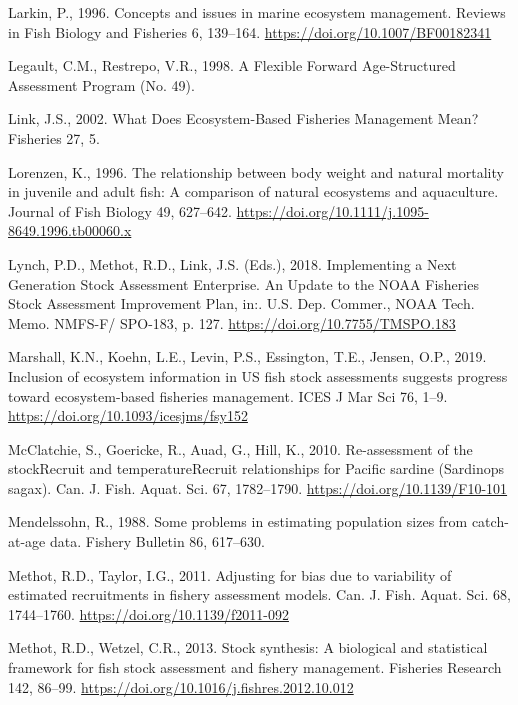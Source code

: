 \documentclass[]{article}
\begin{document}
\leavevmode\hypertarget{ref-larkin1996Concepts}{}%
Larkin, P., 1996. Concepts and issues in marine ecosystem management.
Reviews in Fish Biology and Fisheries 6, 139--164.
\url{https://doi.org/10.1007/BF00182341}

\leavevmode\hypertarget{ref-legault1998Flexible}{}%
Legault, C.M., Restrepo, V.R., 1998. A Flexible Forward Age-Structured
Assessment Program (No. 49).

\leavevmode\hypertarget{ref-link2002What}{}%
Link, J.S., 2002. What Does Ecosystem-Based Fisheries Management Mean?
Fisheries 27, 5.

\leavevmode\hypertarget{ref-lorenzen1996Relationship}{}%
Lorenzen, K., 1996. The relationship between body weight and natural
mortality in juvenile and adult fish: A comparison of natural ecosystems
and aquaculture. Journal of Fish Biology 49, 627--642.
\url{https://doi.org/10.1111/j.1095-8649.1996.tb00060.x}

\leavevmode\hypertarget{ref-lynch2018Implementing}{}%
Lynch, P.D., Methot, R.D., Link, J.S. (Eds.), 2018. Implementing a Next
Generation Stock Assessment Enterprise. An Update to the NOAA Fisheries
Stock Assessment Improvement Plan, in:. U.S. Dep. Commer., NOAA Tech.
Memo. NMFS-F/ SPO-183, p. 127. \url{https://doi.org/10.7755/TMSPO.183}

\leavevmode\hypertarget{ref-marshall2019Inclusion}{}%
Marshall, K.N., Koehn, L.E., Levin, P.S., Essington, T.E., Jensen, O.P.,
2019. Inclusion of ecosystem information in US fish stock assessments
suggests progress toward ecosystem-based fisheries management. ICES J
Mar Sci 76, 1--9. \url{https://doi.org/10.1093/icesjms/fsy152}

\leavevmode\hypertarget{ref-mcclatchie2010Reassessment}{}%
McClatchie, S., Goericke, R., Auad, G., Hill, K., 2010. Re-assessment of
the stockRecruit and temperatureRecruit relationships for Pacific
sardine (Sardinops sagax). Can. J. Fish. Aquat. Sci. 67, 1782--1790.
\url{https://doi.org/10.1139/F10-101}

\leavevmode\hypertarget{ref-mendelssohn1988Problems}{}%
Mendelssohn, R., 1988. Some problems in estimating population sizes from
catch-at-age data. Fishery Bulletin 86, 617--630.

\leavevmode\hypertarget{ref-methot2011Adjusting}{}%
Methot, R.D., Taylor, I.G., 2011. Adjusting for bias due to variability
of estimated recruitments in fishery assessment models. Can. J. Fish.
Aquat. Sci. 68, 1744--1760. \url{https://doi.org/10.1139/f2011-092}

\leavevmode\hypertarget{ref-methot2013Stock}{}%
Methot, R.D., Wetzel, C.R., 2013. Stock synthesis: A biological and
statistical framework for fish stock assessment and fishery management.
Fisheries Research 142, 86--99.
\url{https://doi.org/10.1016/j.fishres.2012.10.012}
\end{document}
